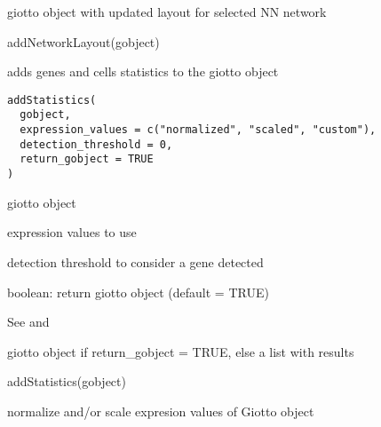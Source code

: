 \documentclass[a4paper]{book}
\begin{document}
%
\begin{Value}
giotto object with updated layout for selected NN network
\end{Value}
%
\begin{Examples}
\begin{ExampleCode}
    addNetworkLayout(gobject)
\end{ExampleCode}
\end{Examples}
%
\begin{Description}\relax
adds genes and cells statistics to the giotto object
\end{Description}
%
\begin{Usage}
\begin{verbatim}
addStatistics(
  gobject,
  expression_values = c("normalized", "scaled", "custom"),
  detection_threshold = 0,
  return_gobject = TRUE
)
\end{verbatim}
\end{Usage}
%
\begin{Arguments}
\begin{ldescription}
\item[\code{gobject}] giotto object

\item[\code{expression\_values}] expression values to use

\item[\code{detection\_threshold}] detection threshold to consider a gene detected

\item[\code{return\_gobject}] boolean: return giotto object (default = TRUE)
\end{ldescription}
\end{Arguments}
%
\begin{Details}\relax
See  and 
\end{Details}
%
\begin{Value}
giotto object if return\_gobject = TRUE, else a list with results
\end{Value}
%
\begin{Examples}
\begin{ExampleCode}
    addStatistics(gobject)
\end{ExampleCode}
\end{Examples}
%
\begin{Description}\relax
normalize and/or scale expresion values of Giotto object
\end{Description}
\end{document}
